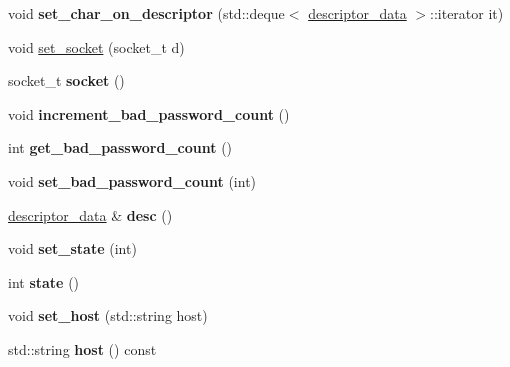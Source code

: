 \begin{DoxyCompactItemize}
\item 
\mbox{\label{classmods_1_1player_ae0103c5de79432ccac31533bda656fa9}} 
void {\bfseries set\+\_\+char\+\_\+on\+\_\+descriptor} (std\+::deque$<$ \hyperlink{structmods_1_1descriptor__data}{descriptor\+\_\+data} $>$\+::iterator it)
\item 
void \hyperlink{classmods_1_1player_ad5c902bb8d73713f04628ca8988c128a}{set\+\_\+socket} (socket\+\_\+t d)
\item 
\mbox{\label{classmods_1_1player_a07013d414884ecff448cf9de45c50efa}} 
socket\+\_\+t {\bfseries socket} ()
\item 
\mbox{\label{classmods_1_1player_af4656fc7741254fc906d03cda32645ec}} 
void {\bfseries increment\+\_\+bad\+\_\+password\+\_\+count} ()
\item 
\mbox{\label{classmods_1_1player_a7211317b58a2079737faa133b88b2dc8}} 
int {\bfseries get\+\_\+bad\+\_\+password\+\_\+count} ()
\item 
\mbox{\label{classmods_1_1player_a7141d48d5c3738c3c1b8939fb17556d3}} 
void {\bfseries set\+\_\+bad\+\_\+password\+\_\+count} (int)
\item 
\mbox{\label{classmods_1_1player_a6f6ccc5cb85fb90fc6c875e74d91bb79}} 
\hyperlink{structmods_1_1descriptor__data}{descriptor\+\_\+data} \& {\bfseries desc} ()
\item 
\mbox{\label{classmods_1_1player_a7d9ade89f11985d139f8ad5baed27a15}} 
void {\bfseries set\+\_\+state} (int)
\item 
\mbox{\label{classmods_1_1player_ac969ea974d0f1d982a3fdb927e2bae8a}} 
int {\bfseries state} ()
\item 
\mbox{\label{classmods_1_1player_aa44c9145134cfbed36edcf10f3c0f2dc}} 
void {\bfseries set\+\_\+host} (std\+::string host)
\item 
\mbox{\label{classmods_1_1player_a62987a5ccddb984f048d2d6921d55817}} 
std\+::string {\bfseries host} () const

\end{DoxyCompactItemize}
